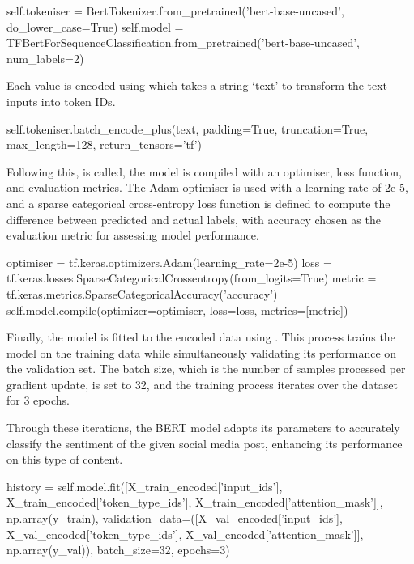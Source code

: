         \begin{python}
self.tokeniser = BertTokenizer.from_pretrained('bert-base-uncased', do_lower_case=True)
self.model = TFBertForSequenceClassification.from_pretrained('bert-base-uncased', num_labels=2)
        \end{python}

        Each value is encoded using  which takes a string `text' to transform the text inputs into token IDs.

        \begin{python}
self.tokeniser.batch_encode_plus(text, padding=True, truncation=True, max_length=128, return_tensors='tf') 
        \end{python}

        Following this,  is called, the model is compiled with an optimiser, loss function, and evaluation metrics. The Adam optimiser is used with a learning rate of 2e-5, and a sparse categorical cross-entropy loss function is defined to compute the difference between predicted and actual labels, with accuracy chosen as the evaluation metric for assessing model performance.

        \begin{python}
optimiser = tf.keras.optimizers.Adam(learning_rate=2e-5)
loss = tf.keras.losses.SparseCategoricalCrossentropy(from_logits=True)
metric = tf.keras.metrics.SparseCategoricalAccuracy('accuracy')
self.model.compile(optimizer=optimiser, loss=loss, metrics=[metric])
        \end{python}

        Finally, the model is fitted to the encoded data using . This process trains the model on the training data while simultaneously validating its performance on the validation set. The batch size, which is the number of samples processed per gradient update, is set to 32, and the training process iterates over the dataset for 3 epochs.

        Through these iterations, the BERT model adapts its parameters to accurately classify the sentiment of the given social media post, enhancing its performance on this type of content.

        \begin{python}
history = self.model.fit([X_train_encoded['input_ids'], X_train_encoded['token_type_ids'], X_train_encoded['attention_mask']], np.array(y_train), validation_data=([X_val_encoded['input_ids'], X_val_encoded['token_type_ids'], X_val_encoded['attention_mask']], np.array(y_val)), batch_size=32, epochs=3)
        \end{python}

